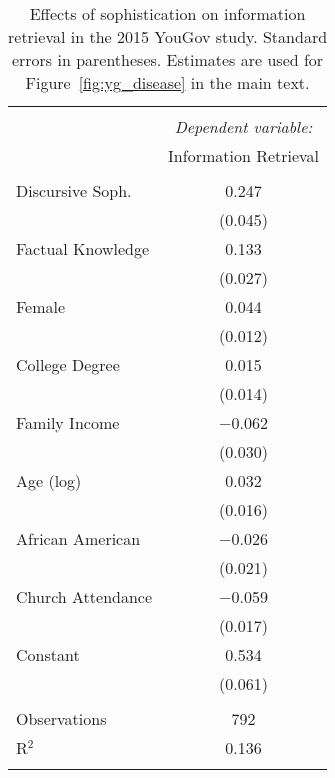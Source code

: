 
\begin{table}[!htbp] \centering 
  \caption[Effects of sophistication on information retrieval in the 2015 YouGov study]{Effects of sophistication on information retrieval in the 2015 YouGov study.
          Standard errors in parentheses. Estimates are used for Figure~\ref{fig:yg_disease} in the main text.} 
  \label{tab:yg_disease} 
\begin{tabular}{@{\extracolsep{0pt}}lc} 
\\[-1.8ex]\hline 
\hline \\[-1.8ex] 
 & \multicolumn{1}{c}{\textit{Dependent variable:}} \\ 
\cline{2-2} 
 & Information Retrieval \\ 
\hline \\[-1.8ex] 
 Discursive Soph. & 0.247 \\ 
  & (0.045) \\ 
  Factual Knowledge & 0.133 \\ 
  & (0.027) \\ 
  Female & 0.044 \\ 
  & (0.012) \\ 
  College Degree & 0.015 \\ 
  & (0.014) \\ 
  Family Income & $-$0.062 \\ 
  & (0.030) \\ 
  Age (log) & 0.032 \\ 
  & (0.016) \\ 
  African American & $-$0.026 \\ 
  & (0.021) \\ 
  Church Attendance & $-$0.059 \\ 
  & (0.017) \\ 
  Constant & 0.534 \\ 
  & (0.061) \\ 
 \hline \\[-1.8ex] 
Observations & 792 \\ 
R$^{2}$ & 0.136 \\ 
\hline 
\hline \\[-1.8ex] 
\end{tabular} 
\end{table} 
